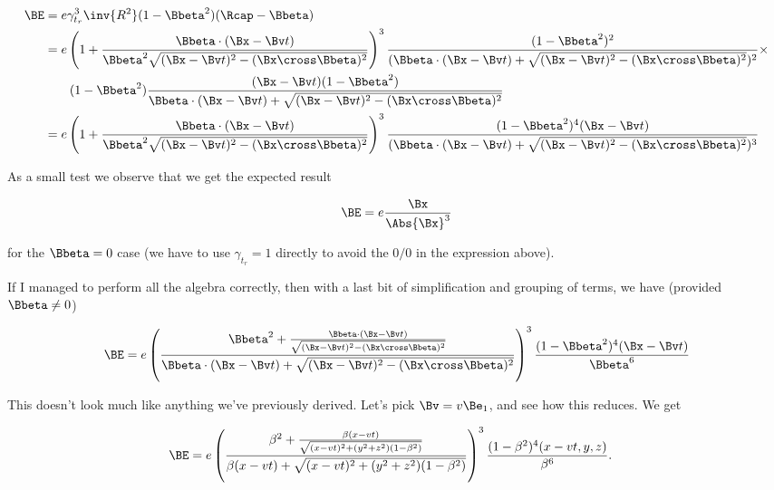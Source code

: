 \begin{align*}
\BE &=
e \gamma_{t_r}^3 \inv{R^2} (1 - \Bbeta^2)(\Rcap - \Bbeta) \\
&=
e 
\left( 1 + \frac{\Bbeta \cdot (\Bx -\Bv t) }{ \Bbeta^2 \sqrt{ (\Bx - \Bv t)^2 - (\Bx \cross \Bbeta)^2 } } \right)^3
\frac{(1 - \Bbeta^2)^2 }{ (\Bbeta \cdot (\Bx - \Bv t) + \sqrt{ (\Bx - \Bv t)^2 - (\Bx \cross \Bbeta)^2 })^2 } \times \\
&\qquad (1 -\Bbeta^2)
\frac{(\Bx - \Bv t)(1 -\Bbeta^2)}{
\Bbeta \cdot (\Bx - \Bv t) + \sqrt{ (\Bx - \Bv t)^2 - (\Bx \cross \Bbeta)^2 } 
} \\
&=
e 
\left( 1 + \frac{\Bbeta \cdot (\Bx -\Bv t)}{ \Bbeta^2 \sqrt{ (\Bx - \Bv t)^2 - (\Bx \cross \Bbeta)^2 } } \right)^3
\frac{ (1 - \Bbeta^2)^4 (\Bx - \Bv t)
}{(\Bbeta \cdot (\Bx - \Bv t) + \sqrt{ (\Bx - \Bv t)^2 - (\Bx \cross \Bbeta)^2 })^3 } 
\end{align*}

As a small test we observe that we get the expected result

\begin{equation}\label{eqn:relElectroDynProblemSet5:820}
\BE = e \frac{\Bx}{\Abs{\Bx}^3}
\end{equation}

for the $\Bbeta = 0$ case (we have to use $\gamma_{t_r} = 1$ directly to avoid the $0/0$ in the expression above).

If I managed to perform all the algebra correctly, then with a last bit of simplification and grouping of terms, we have (provided $\Bbeta \ne 0$)

\begin{equation}\label{eqn:relElectroDynProblemSet5:810}
\BE 
= 
e 
\left(\frac{
\Bbeta^2 
+
\frac{ \Bbeta \cdot (\Bx -\Bv t)}{ \sqrt{ (\Bx - \Bv t)^2 - (\Bx \cross \Bbeta)^2 } }
}
{
\Bbeta \cdot (\Bx -\Bv t) 
+
\sqrt{(\Bx - \Bv t)^2 - (\Bx \cross \Bbeta)^2 }
}\right)^3
\frac{(1 -\Bbeta^2)^4 (\Bx - \Bv t)} {\Bbeta^6 }
\end{equation}

This doesn't look much like anything we've previously derived.  Let's pick $\Bv = v \Be_1$, and see how this reduces.  We get

\begin{align*}
\BE
&= 
e 
\left(\frac{ \beta^2 + \frac{ \beta (x -v t)}{ \sqrt{ (x - v t)^2 + (y^2 + z^2)(1 -\beta^2) } } }
{ \beta (x -v t) + \sqrt{(x - v t)^2 + (y^2 + z^2)( 1 - \beta^2) } }
\right)^3
\frac{(1 -\beta^2)^4 (x - v t, y, z)} {\beta^6 }.
\end{align*}

